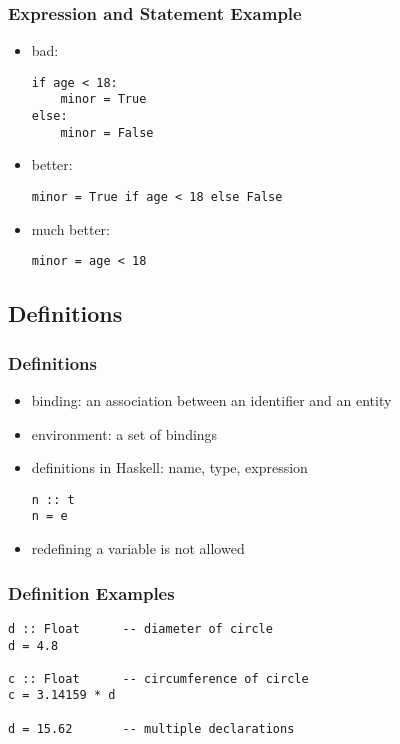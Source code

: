 \documentclass[dvipsnames]{beamer}
\theoremstyle{plain}
\begin{document}
\begin{frame}[fragile]
  \frametitle{Expression and Statement Example}

  \begin{itemize}
    \item bad:
    \smallskip
    \begin{lstlisting}
if age < 18:
    minor = True
else:
    minor = False
    \end{lstlisting}

    \pause
    \medskip
    \item better:
    \smallskip
    \begin{lstlisting}
minor = True if age < 18 else False
    \end{lstlisting}

    \pause
    \medskip
    \item much better:
    \smallskip
    \begin{lstlisting}
minor = age < 18
    \end{lstlisting}
  \end{itemize}
\end{frame}

\subsection{Definitions}

\lstset{language=haskell}

\begin{frame}[fragile]
  \frametitle{Definitions}

  \begin{itemize}
    \item \alert{binding}: an association between an identifier and an entity
    \item \alert{environment}: a set of bindings

    \pause
    \bigskip
    \item definitions in Haskell: name, type, expression
    \begin{lstlisting}
n :: t
n = e
    \end{lstlisting}

    \item redefining a variable is not allowed
  \end{itemize}
\end{frame}

\begin{frame}[fragile]
  \frametitle{Definition Examples}

  \begin{lstlisting}
d :: Float      -- diameter of circle
d = 4.8

c :: Float      -- circumference of circle
c = 3.14159 * d

d = 15.62       -- multiple declarations
  \end{lstlisting}
\end{frame}
\end{document}
